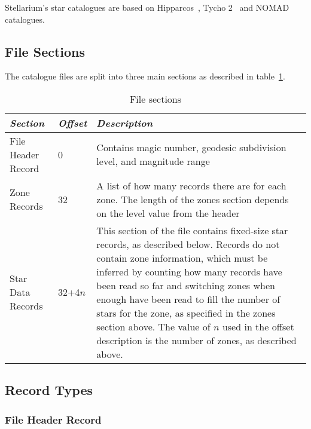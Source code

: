 Stellarium's star catalogues are based on Hipparcos~\citep{1997ESASP1200.....E, 2012AstL...38..331A}, Tycho 2~\citep{2000A&A...355L..27H} and NOMAD~\citep{2004AAS...205.4815Z} catalogues.

\subsection{File Sections}%
\label{sec:Catalogues:stars:sections}

The catalogue files are split into three main sections as described in
table~\ref{tab:Catalogues:stars:sections}.

\begin{table}[htb]
\begin{tabularx}{\textwidth}{l l X}\toprule
\emph{Section} & \emph{Offset} & \emph{Description}\\\midrule
File Header Record &  0        & Contains magic number, geodesic subdivision level, and magnitude range\\%
Zone Records       & 32        & A list of how many records there are for each zone.
                                 The length of the zones section depends on the level value from the header\\%
Star Data Records  & 32+4$n$   & This section of the file contains fixed-size star records, as described below. 
                                 Records do not contain zone information, which must be inferred by counting 
                                 how many records have been read so far and switching zones when enough have been read 
                                 to fill the number of stars for the zone, as specified in the zones section above. 
                                 The value of $n$ used in the offset description is the number of zones, as described above.\\\bottomrule
\end{tabularx}
\caption{File sections}
\label{tab:Catalogues:stars:sections}
\end{table}

\subsection{Record Types}%
\label{sec:Catalogues:stars:record:types}

\subsubsection{File Header Record}%
\label{sec:Catalogues:stars:record:header}

